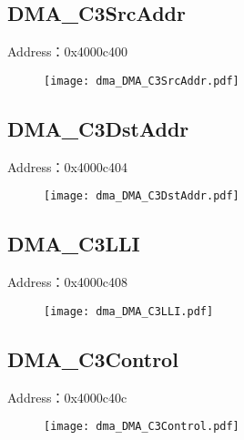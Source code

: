 \subsection{DMA\_C3SrcAddr}
\label{dma-DMA-C3SrcAddr}
Address：0x4000c400
 \begin{figure}[H]
\texttt{[image: dma\_DMA\_C3SrcAddr.pdf]}
\end{figure}

\subsection{DMA\_C3DstAddr}
\label{dma-DMA-C3DstAddr}
Address：0x4000c404
 \begin{figure}[H]
\texttt{[image: dma\_DMA\_C3DstAddr.pdf]}
\end{figure}

\subsection{DMA\_C3LLI}
\label{dma-DMA-C3LLI}
Address：0x4000c408
 \begin{figure}[H]
\texttt{[image: dma\_DMA\_C3LLI.pdf]}
\end{figure}

\subsection{DMA\_C3Control}
\label{dma-DMA-C3Control}
Address：0x4000c40c
 \begin{figure}[H]
\texttt{[image: dma\_DMA\_C3Control.pdf]}
\end{figure}

